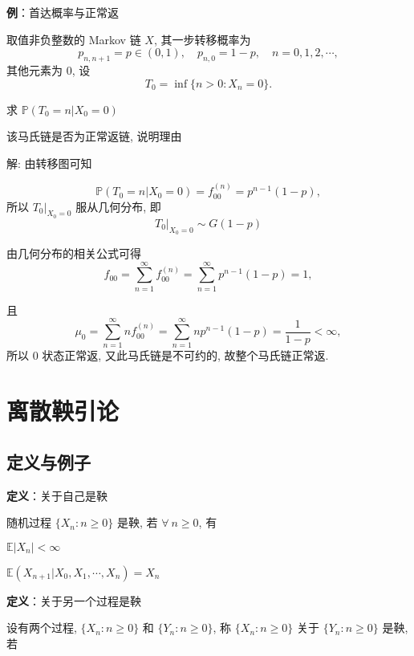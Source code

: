 \documentclass[openany]{ctexbook}
\theoremstyle{kaiti}
\theoremstyle{normal}
\begin{document}
\textbf{例}：首达概率与正常返

取值非负整数的 Markov 链 $X$, 其一步转移概率为
\begin{equation}
  p_{n,n+1}=p\in(0,1),\quad p_{n,0}=1-p,\quad n=0,1,2,\cdots,
\end{equation}
其他元素为 $0$, 设
\begin{equation}
  T_0=\inf\{n>0:X_n=0\}.
\end{equation}

求 $\mathbb{P}(T_0=n|X_0=0)$

该马氏链是否为正常返链, 说明理由

解: 由转移图可知

\begin{equation}
  \mathbb{P}(T_0=n|X_0=0)=f_{00}^{(n)}=p^{n-1}(1-p),
\end{equation}
所以 $T_0|_{X_0=0}$ 服从几何分布, 即
\begin{equation}
  T_0|_{X_0=0}\sim G(1-p)
\end{equation}

由几何分布的相关公式可得
\begin{equation}
 f_{00}=\sum_{n=1}^\infty f_{00}^{(n)}=\sum_{n=1}^\infty p^{n-1}(1-p)=1,
\end{equation}

且
\begin{equation}
  \mu_0=\sum_{n=1}^\infty nf_{00}^{(n)}=\sum_{n=1}^\infty np^{n-1}(1-p)=\frac{1}{1-p}<\infty,
\end{equation}
所以 $0$ 状态正常返, 又此马氏链是不可约的, 故整个马氏链正常返.

\chapter{离散鞅引论}

\section{定义与例子}

\textbf{定义}：关于自己是鞅

随机过程 $\{X_n:n\geqslant0\}$ 是鞅, 若 $\forall~n\geqslant0$, 有

$\mathbb{E}|X_n|<\infty$

$\mathbb{E}(X_{n+1}|X_0,X_1,\cdots,X_n)=X_n$

\textbf{定义}：关于另一个过程是鞅

设有两个过程, $\{X_n:n\geqslant0\}$ 和 $\{Y_n:n\geqslant0\}$, 称 $\{X_n:n\geqslant0\}$ 关于 $\{Y_n:n\geqslant0\}$ 是鞅, 若 
\end{document}
